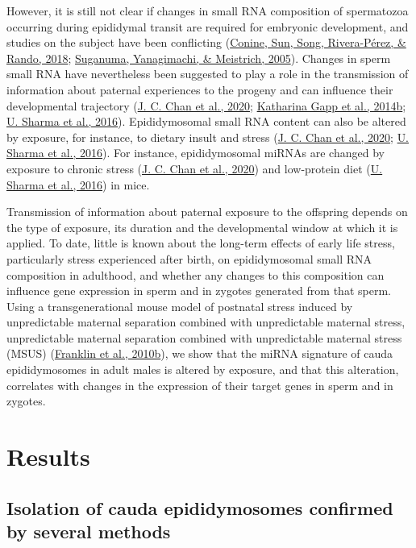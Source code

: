 \documentclass[12pt,twoside]{reedthesis}
\begin{document}
However, it is still not clear if changes in small RNA composition of
spermatozoa occurring during epididymal transit are required for
embryonic development, and studies on the subject have been conflicting
(\protect\hyperlink{ref-conine_2018}{Conine, Sun, Song, Rivera-Pérez, \& Rando, 2018}; \protect\hyperlink{ref-suganuma_2005}{Suganuma, Yanagimachi, \& Meistrich, 2005}). Changes in sperm small RNA have
nevertheless been suggested to play a role in the transmission of
information about paternal experiences to the progeny and can influence
their developmental trajectory (\protect\hyperlink{ref-chan_2020}{J. C. Chan et al., 2020}; \protect\hyperlink{ref-gapp_2014}{Katharina Gapp et al., 2014b}; \protect\hyperlink{ref-sharma_2016}{U. Sharma et al., 2016}).
Epididymosomal small RNA content can also be altered by exposure, for
instance, to dietary insult and stress (\protect\hyperlink{ref-chan_2020}{J. C. Chan et al., 2020}; \protect\hyperlink{ref-sharma_2016}{U. Sharma et al., 2016}). For
instance, epididymosomal miRNAs are changed by exposure to chronic
stress (\protect\hyperlink{ref-chan_2020}{J. C. Chan et al., 2020}) and low-protein diet (\protect\hyperlink{ref-sharma_2016}{U. Sharma et al., 2016}) in mice.

Transmission of information about paternal exposure to the offspring
depends on the type of exposure, its duration and the developmental
window at which it is applied. To date, little is known about the
long-term effects of early life stress, particularly stress experienced
after birth, on epididymosomal small RNA composition in adulthood, and
whether any changes to this composition can influence gene expression in
sperm and in zygotes generated from that sperm. Using a
transgenerational mouse model of postnatal stress induced by
unpredictable maternal separation combined with unpredictable maternal
stress, unpredictable maternal separation combined with unpredictable
maternal stress (MSUS) (\protect\hyperlink{ref-franklin_2010}{Franklin et al., 2010b}), we show that the miRNA
signature of cauda epididymosomes in adult males is altered by exposure,
and that this alteration, correlates with changes in the expression of
their target genes in sperm and in zygotes.

\hypertarget{results-1}{%
\section{Results}\label{results-1}}

\hypertarget{isolation-of-cauda-epididymosomes-confirmed-by-several-methods}{%
\subsection{Isolation of cauda epididymosomes confirmed by several methods}\label{isolation-of-cauda-epididymosomes-confirmed-by-several-methods}}
\end{document}
